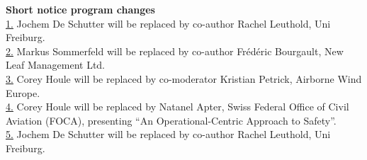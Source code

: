 \textbf{\Large Short notice program changes}\\

\hypertarget{change01}{\hyperlink{change01rev}{1.}} Jochem De Schutter will be replaced by co-author Rachel Leuthold, Uni Freiburg.\\
\hypertarget{change02}{\hyperlink{change02rev}{2.}} Markus Sommerfeld will be replaced by co-author Frédéric Bourgault, New Leaf Management Ltd.\\
\hypertarget{change03}{\hyperlink{change03rev}{3.}} Corey Houle will be replaced by co-moderator Kristian Petrick, Airborne Wind Europe.\\
\hypertarget{change04}{\hyperlink{change04rev}{4.}} Corey Houle will be replaced by Natanel Apter, Swiss Federal Office of Civil Aviation (FOCA), presenting ``An Operational-Centric Approach to Safety''.\\
\hypertarget{change05}{\hyperlink{change05rev}{5.}} Jochem De Schutter will be replaced by co-author Rachel Leuthold, Uni Freiburg.\\
